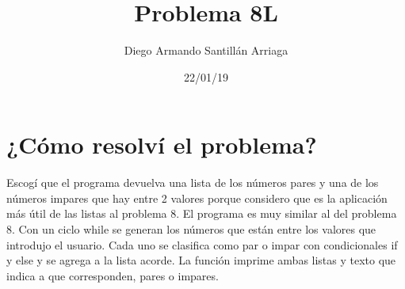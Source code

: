 \documentclass[letterpaper, 12pt, oneside]{article}%
\title{\Huge Problema 8L}
\author{Diego Armando Santillán Arriaga}
\date{22/01/19}
\begin{document}
\maketitle
\newpage
\section*{¿Cómo resolví el problema?}
Escogí que el programa devuelva una lista de los números  pares y una de los números impares que hay entre 2 valores  porque considero que es la aplicación más útil de las listas al problema 8.
El programa es muy similar al del problema 8. Con un ciclo while se generan los números que están entre los valores que introdujo el usuario. Cada uno se clasifica como par o impar con condicionales if y else y se agrega a la lista acorde. La función imprime ambas listas y texto que indica a que corresponden, pares o impares. 
\end{document}
